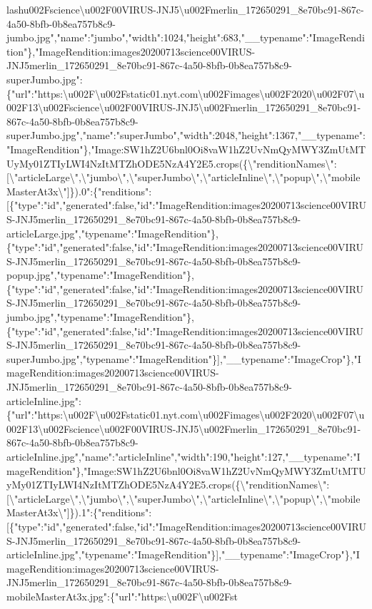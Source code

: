 lash{}u002Fscience\textbackslash{}u002F00VIRUS-JNJ5\textbackslash{}u002Fmerlin\_172650291\_8e70bc91-867c-4a50-8bfb-0b8ea757b8c9-jumbo.jpg","name":"jumbo","width":1024,"height":683,"\_\_typename":"ImageRendition"\},"ImageRendition:images20200713science00VIRUS-JNJ5merlin\_172650291\_8e70bc91-867c-4a50-8bfb-0b8ea757b8c9-superJumbo.jpg":\{"url":"https:\textbackslash{}u002F\textbackslash{}u002Fstatic01.nyt.com\textbackslash{}u002Fimages\textbackslash{}u002F2020\textbackslash{}u002F07\textbackslash{}u002F13\textbackslash{}u002Fscience\textbackslash{}u002F00VIRUS-JNJ5\textbackslash{}u002Fmerlin\_172650291\_8e70bc91-867c-4a50-8bfb-0b8ea757b8c9-superJumbo.jpg","name":"superJumbo","width":2048,"height":1367,"\_\_typename":"ImageRendition"\},"Image:SW1hZ2U6bnl0Oi8vaW1hZ2UvNmQyMWY3ZmUtMTUyMy01ZTIyLWI4NzItMTZhODE5NzA4Y2E5.crops(\{\textbackslash{}"renditionNames\textbackslash{}":{[}\textbackslash{}"articleLarge\textbackslash{}",\textbackslash{}"jumbo\textbackslash{}",\textbackslash{}"superJumbo\textbackslash{}",\textbackslash{}"articleInline\textbackslash{}",\textbackslash{}"popup\textbackslash{}",\textbackslash{}"mobileMasterAt3x\textbackslash{}"{]}\}).0":\{"renditions":{[}\{"type":"id","generated":false,"id":"ImageRendition:images20200713science00VIRUS-JNJ5merlin\_172650291\_8e70bc91-867c-4a50-8bfb-0b8ea757b8c9-articleLarge.jpg","typename":"ImageRendition"\},\{"type":"id","generated":false,"id":"ImageRendition:images20200713science00VIRUS-JNJ5merlin\_172650291\_8e70bc91-867c-4a50-8bfb-0b8ea757b8c9-popup.jpg","typename":"ImageRendition"\},\{"type":"id","generated":false,"id":"ImageRendition:images20200713science00VIRUS-JNJ5merlin\_172650291\_8e70bc91-867c-4a50-8bfb-0b8ea757b8c9-jumbo.jpg","typename":"ImageRendition"\},\{"type":"id","generated":false,"id":"ImageRendition:images20200713science00VIRUS-JNJ5merlin\_172650291\_8e70bc91-867c-4a50-8bfb-0b8ea757b8c9-superJumbo.jpg","typename":"ImageRendition"\}{]},"\_\_typename":"ImageCrop"\},"ImageRendition:images20200713science00VIRUS-JNJ5merlin\_172650291\_8e70bc91-867c-4a50-8bfb-0b8ea757b8c9-articleInline.jpg":\{"url":"https:\textbackslash{}u002F\textbackslash{}u002Fstatic01.nyt.com\textbackslash{}u002Fimages\textbackslash{}u002F2020\textbackslash{}u002F07\textbackslash{}u002F13\textbackslash{}u002Fscience\textbackslash{}u002F00VIRUS-JNJ5\textbackslash{}u002Fmerlin\_172650291\_8e70bc91-867c-4a50-8bfb-0b8ea757b8c9-articleInline.jpg","name":"articleInline","width":190,"height":127,"\_\_typename":"ImageRendition"\},"Image:SW1hZ2U6bnl0Oi8vaW1hZ2UvNmQyMWY3ZmUtMTUyMy01ZTIyLWI4NzItMTZhODE5NzA4Y2E5.crops(\{\textbackslash{}"renditionNames\textbackslash{}":{[}\textbackslash{}"articleLarge\textbackslash{}",\textbackslash{}"jumbo\textbackslash{}",\textbackslash{}"superJumbo\textbackslash{}",\textbackslash{}"articleInline\textbackslash{}",\textbackslash{}"popup\textbackslash{}",\textbackslash{}"mobileMasterAt3x\textbackslash{}"{]}\}).1":\{"renditions":{[}\{"type":"id","generated":false,"id":"ImageRendition:images20200713science00VIRUS-JNJ5merlin\_172650291\_8e70bc91-867c-4a50-8bfb-0b8ea757b8c9-articleInline.jpg","typename":"ImageRendition"\}{]},"\_\_typename":"ImageCrop"\},"ImageRendition:images20200713science00VIRUS-JNJ5merlin\_172650291\_8e70bc91-867c-4a50-8bfb-0b8ea757b8c9-mobileMasterAt3x.jpg":\{"url":"https:\textbackslash{}u002F\textbackslash{}u002Fst